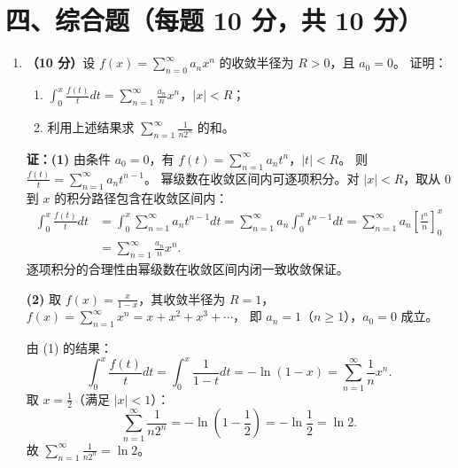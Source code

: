 \documentclass[12pt,a4paper]{ctexart}
\begin{document}
\section*{四、综合题（每题 10 分，共 10 分）}

\begin{enumerate}[leftmargin=*,label=\arabic*.,start=11]
  \item \textbf{（10 分）}设 $f(x) = \sum_{n=0}^{\infty} a_n x^n$ 的收敛半径为 $R > 0$，且 $a_0 = 0$。
    证明：
    \begin{enumerate}
      \item $\int_0^x \frac{f(t)}{t} dt = \sum_{n=1}^{\infty} \frac{a_n}{n} x^n$，$|x| < R$；
      \item 利用上述结果求 $\displaystyle\sum_{n=1}^{\infty}\frac{1}{n 2^n}$ 的和。
    \end{enumerate}

    \textbf{证：(1)} 由条件 $a_0=0$，有 $f(t) = \sum_{n=1}^{\infty} a_n t^n$，$|t| < R$。
    则 $\frac{f(t)}{t} = \sum_{n=1}^{\infty} a_n t^{n-1}$。
    幂级数在收敛区间内可逐项积分。对 $|x| < R$，取从 $0$ 到 $x$ 的积分路径包含在收敛区间内：
    \begin{align*}
      \int_0^x \frac{f(t)}{t} dt
      &= \int_0^x \sum_{n=1}^{\infty} a_n t^{n-1} dt
       = \sum_{n=1}^{\infty} a_n \int_0^x t^{n-1} dt
       = \sum_{n=1}^{\infty} a_n \left[\frac{t^n}{n}\right]_0^x \\
      &= \sum_{n=1}^{\infty} \frac{a_n}{n} x^n.
    \end{align*}
    逐项积分的合理性由幂级数在收敛区间内闭一致收敛保证。

    \textbf{(2)} 取 $f(x) = \frac{x}{1-x}$，其收敛半径为 $R=1$，
    $f(x) = \sum_{n=1}^{\infty} x^n = x + x^2 + x^3 + \cdots$，
    即 $a_n = 1$（$n \ge 1$），$a_0=0$ 成立。

    由 (1) 的结果：
    \[
    \int_0^x \frac{f(t)}{t} dt
    = \int_0^x \frac{1}{1-t} dt
    = -\ln(1-x)
    = \sum_{n=1}^{\infty} \frac{1}{n} x^n.
    \]
    取 $x = \frac{1}{2}$（满足 $|x| < 1$）：
    \[
    \sum_{n=1}^{\infty}\frac{1}{n 2^n} = -\ln\!\left(1-\frac{1}{2}\right)
    = -\ln\frac{1}{2}
    = \ln 2.
    \]
    故 $\displaystyle\sum_{n=1}^{\infty}\frac{1}{n 2^n} = \ln 2$。
\end{enumerate}
\end{document}
